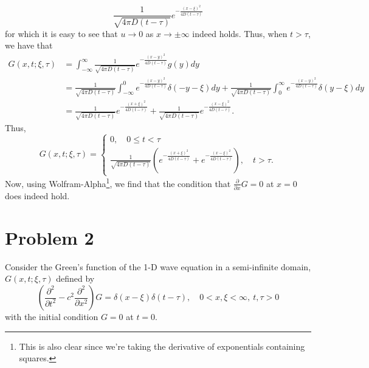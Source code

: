 \documentclass{article}
\begin{document}
\[
\frac{1}{\sqrt{4\pi D(t-\tau)}}e^{-\frac{(x-\xi)^2}{4D(t-\tau)}}
\]
for which it is easy to see that $u\to0$ as $x\to\pm\infty$ indeed holds. Thus, when $t>\tau$, we have that 
\begin{align*}
	G(x,t;\xi,\tau)&=\int_{-\infty}^\infty\frac{1}{\sqrt{4\pi D(t-\tau)}}e^{-\frac{(x-y)^2}{4D(t-\tau)}}g(y)dy\\&=
	\frac{1}{\sqrt{4\pi D(t-\tau)}}\int_{-\infty}^0e^{-\frac{(x-y)^2}{4D(t-\tau)}}\delta(-y-\xi)dy+\frac{1}{\sqrt{4\pi D(t-\tau)}}\int_{0}^\infty e^{-\frac{(x-y)^2}{4D(t-\tau)}}\delta(y-\xi)dy\\&=
	\frac{1}{\sqrt{4\pi D(t-\tau)}}e^{-\frac{(x+\xi)^2}{4D(t-\tau)}}+\frac{1}{\sqrt{4\pi D(t-\tau)}}e^{-\frac{(x-\xi)^2}{4D(t-\tau)}}.
\end{align*}
Thus,
\[
G(x,t;\xi,\tau)=\begin{cases}
	0, \quad 0\leq t<\tau\\
	\frac{1}{\sqrt{4\pi D(t-\tau)}}\left(e^{-\frac{(x+\xi)^2}{4D(t-\tau)}}+e^{-\frac{(x-\xi)^2}{4D(t-\tau)}}\right), \quad t>\tau.
\end{cases}
\]
Now, using Wolfram-Alpha\footnote{This is also clear since we're taking the derivative of exponentials containing squares.}, we find that the condition that $\frac{\partial}{\partial x}G=0$ at $x=0$ does indeed hold. 


\section{Problem 2}
Consider the Green's function of the 1-D wave equation in a semi-infinite domain, $G(x,t;\xi,\tau)$ defined by 
\[
\left(\frac{\partial^2}{\partial t^2}-c^2\frac{\partial^2}{\partial x^2}\right)G=\delta(x-\xi)\delta(t-\tau), \quad 0<x,\xi<\infty, ~t,\tau>0
\]
with the initial condition $G=0$ at $t=0$.
\end{document}
